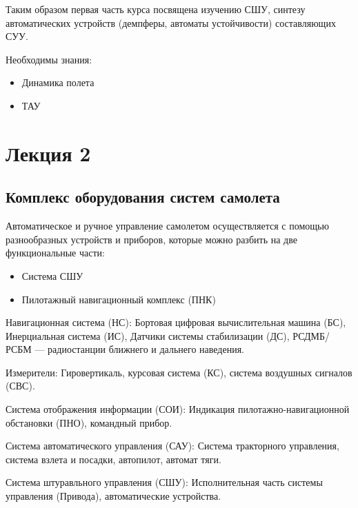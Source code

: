 \documentclass{article}
\begin{document}
Таким образом первая часть курса посвящена изучению СШУ, синтезу автоматических
устройств (демпферы, автоматы устойчивости) составляющих СУУ.

Необходимы знания:
\begin{itemize}
	\item Динамика полета
	\item ТАУ
\end{itemize}
\newpage

\section{Лекция 2}
\subsection{Комплекс оборудования систем самолета}

Автоматическое и ручное управление самолетом осуществляется с помощью
разнообразных устройств и приборов, которые можно разбить на две функциональные
части:
\begin{itemize}
	\item{Система СШУ}
	\item{Пилотажный навигационный комплекс (ПНК)}
\end{itemize}

Навигационная система (НС): Бортовая цифровая вычислительная машина (БС),
Инерциальная система (ИС), Датчики системы стабилизации (ДС), РСДМБ/РСБМ ---
радиостанции ближнего и дальнего наведения.

Измерители: Гировертикаль, курсовая система (КС), система воздушных сигналов
(СВС).

Система отображения информации (СОИ): Индикация пилотажно-навигационной
обстановки (ПНО), командный прибор.

Система автоматического управления (САУ): Система тракторного управления,
система взлета и посадки, автопилот, автомат тяги.

Система штуравльного управления (СШУ): Исполнительная часть системы управления
(Привода), автоматические устройства.
\end{document}
